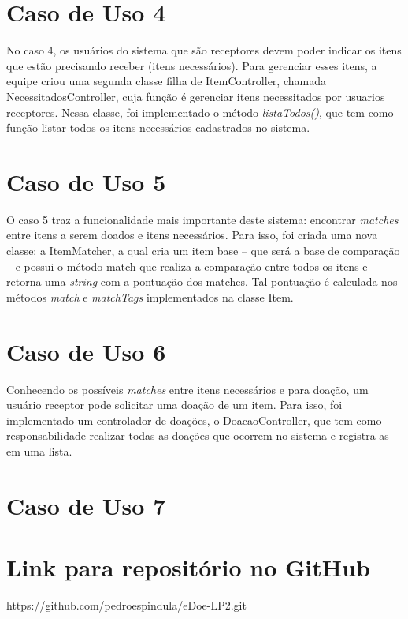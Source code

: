 \documentclass[journal,12pt,onecolumn,draftclsnofoot,]{article}
\begin{document}
	
	\section{Caso de Uso 4}
	No caso 4, os usuários do sistema que são receptores devem poder indicar os itens que estão precisando receber (itens necessários). Para gerenciar esses itens, a equipe criou uma segunda classe filha de ItemController, chamada NecessitadosController, cuja função é gerenciar itens necessitados por usuarios receptores. Nessa classe, foi implementado o método \textit{listaTodos()}, que tem como função listar todos os itens necessários cadastrados no sistema.
	
	\section{Caso de Uso 5}
	O caso 5 traz a funcionalidade mais importante deste sistema: encontrar \textit{matches} entre itens a serem doados e itens necessários. Para isso, foi criada uma nova classe: a ItemMatcher, a qual cria um item base -- que será a base de comparação -- e possui o método match que realiza a comparação entre todos os itens e retorna uma \textit{string} com a pontuação dos matches. Tal pontuação é calculada nos métodos \textit{match} e \textit{matchTags} implementados na classe Item.
	
	\section{Caso de Uso 6}
	Conhecendo os possíveis \textit{matches} entre itens necessários e para doação, um usuário receptor pode solicitar uma doação de um item. Para isso, foi implementado um controlador de doações, o DoacaoController, que tem como responsabilidade realizar todas as doações que ocorrem no sistema e registra-as em uma lista.

	
	\section{Caso de Uso 7}	
	
		
	
	\section{Link para repositório no GitHub}
	https://github.com/pedroespindula/eDoe-LP2.git
	
\end{document}
